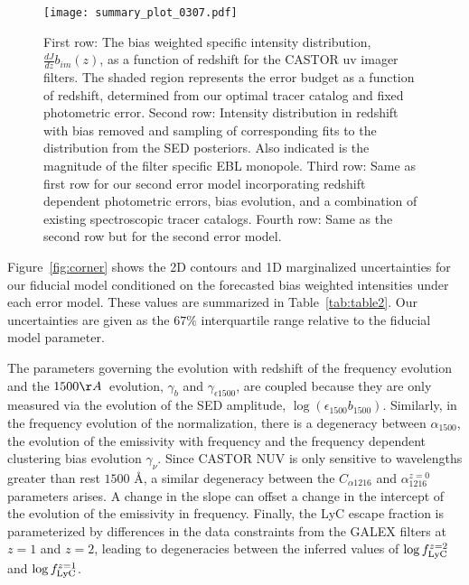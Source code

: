 \documentclass[fleqn,usenatbib]{mnras}
\begin{document}
\begin{figure*}
    \begin{center}
    \texttt{[image: summary\_plot\_0307.pdf]}
    \end{center}
    \caption{\label{fig:dJdzbjuv} First row: The bias weighted specific intensity distribution, $\frac{dJ}{dz} b_{im}(z)$, as a function of redshift for the {\small CASTOR} uv imager filters. The shaded region represents the error budget as a function of redshift, determined from our optimal tracer catalog and fixed photometric error. Second row: Intensity distribution in redshift with bias removed and sampling of corresponding fits to the distribution from the SED posteriors. Also indicated is the magnitude of the filter specific EBL monopole. Third row: Same as first row for our second error model incorporating redshift dependent photometric errors, bias evolution, and a combination of existing spectroscopic tracer catalogs. Fourth row: Same as the second row but for the second error model.}
\end{figure*}


Figure~\ref{fig:corner} shows the 2D contours and 1D marginalized uncertainties for our fiducial model conditioned on the forecasted bias weighted intensities under each error model. These values are summarized in Table~\ref{tab:table2}. Our uncertainties are given as the $67\%$ interquartile range relative to the fiducial model parameter. 

The parameters governing the evolution with redshift of the frequency evolution and the $1500 \AA$\ evolution, $\gamma_b$ and $\gamma_{\epsilon 1500}$, are coupled because they are only measured via the evolution of the SED amplitude, $\log(\epsilon_{1500} b_{1500})$. Similarly, in the frequency evolution of the normalization, there is a degeneracy between $\alpha_{1500}$, the evolution of the emissivity with frequency and the frequency dependent clustering bias evolution $\gamma_{\nu}$. Since {\small CASTOR} NUV is only sensitive to wavelengths greater than rest $1500$ \AA, a similar degeneracy between the $C_{\alpha 1216}$ and $\alpha_{1216}^{z=0}$ parameters arises. A change in the slope can offset a change in the intercept of the evolution of the emissivity in frequency. Finally, the LyC escape fraction is parameterized by differences in the data constraints from the {\small GALEX} filters at $z=1$ and $z=2$, leading to degeneracies between the inferred values of $\log f_{\rm LyC}^{z=2}$ and $\log f_{\rm LyC}^{z=1}$. 
\end{document}
